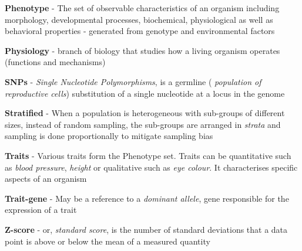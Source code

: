 \begin{mybox}
    \textbf{Phenotype} - The set of observable characteristics of an organism including
    morphology, developmental processes, biochemical, physiological as well as
    behavioral properties - generated from genotype and environmental factors
\end{mybox}

\begin{mybox}
    \textbf{Physiology} - branch of biology that studies how a living organism
    operates (functions and mechanisms)
\end{mybox}

\begin{mybox}
    \textbf{SNPs} - \textit{Single Nucleotide Polymorphisms}, is a germline (
    \textit{population of reproductive cells}) substitution of a single nucleotide
    at a locus in the genome
\end{mybox}

\begin{mybox}
    \textbf{Stratified} - When a population is heterogeneous with sub-groups of
    different sizes, instead of random sampling, the sub-groups are arranged in
    \textit{strata} and sampling is done proportionally to mitigate sampling bias
\end{mybox}

\begin{mybox}
    \textbf{Traits} - Various traits form the Phenotype set. Traits can be quantitative
    such as \textit{blood pressure}, \textit{height} or qualitative such as
    \textit{eye colour}. It characterises specific aspects of an organism
\end{mybox}

\begin{mybox}
    \textbf{Trait-gene} - May be a reference to a \textit{dominant allele}, gene
    responsible for the expression of a trait
\end{mybox}

\begin{mybox}
    \textbf{Z-score} - or, \textit{standard score}, is the number of standard
    deviations that a data point is above or below the mean of a measured quantity
\end{mybox}
